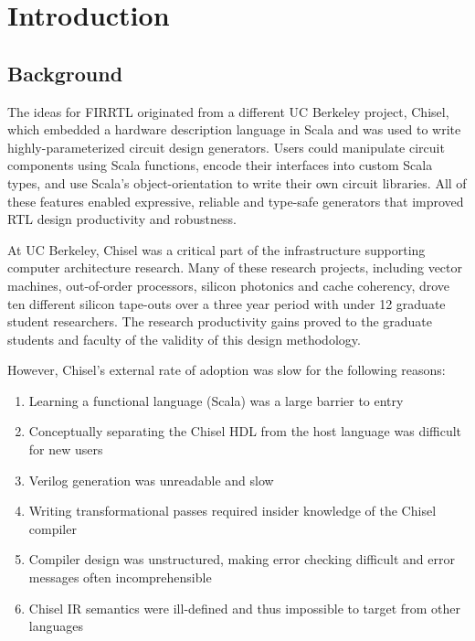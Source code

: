 \documentclass[12pt]{article}
\begin{document}
\maketitle
\tableofcontents
\newpage


\section{Introduction}

\subsection{Background}
The ideas for FIRRTL originated from a different UC Berkeley project, Chisel, which embedded a hardware description language in Scala and was used to write highly-parameterized circuit design generators.
Users could manipulate circuit components using Scala functions, encode their interfaces into custom Scala types, and use Scala's object-orientation to write their own circuit libraries.
All of these features enabled expressive, reliable and type-safe generators that improved RTL design productivity and robustness.

At UC Berkeley, Chisel was a critical part of the infrastructure supporting computer architecture research.
Many of these research projects, including vector machines, out-of-order processors, silicon photonics and cache coherency, drove ten different silicon tape-outs over a three year period with under 12 graduate student researchers.
The research productivity gains proved to the graduate students and faculty of the validity of this design methodology.

However, Chisel's external rate of adoption was slow for the following reasons:
\begin{enumerate}[topsep=3pt,itemsep=-0.5ex,partopsep=1ex,parsep=1ex]
\item Learning a functional language (Scala) was a large barrier to entry
\item Conceptually separating the Chisel HDL from the host language was difficult for new users
\item Verilog generation was unreadable and slow
\item Writing transformational passes required insider knowledge of the Chisel compiler
\item Compiler design was unstructured, making error checking difficult and error messages often incomprehensible
\item Chisel IR semantics were ill-defined and thus impossible to target from other languages
\end{enumerate}
\end{document}
